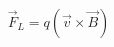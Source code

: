 \documentclass[preview]{standalone}
\begin{document}
\begin{align*}
\vec{F}_L = q( \vec{v} \times \vec{B} )
\end{align*}
\end{document}
